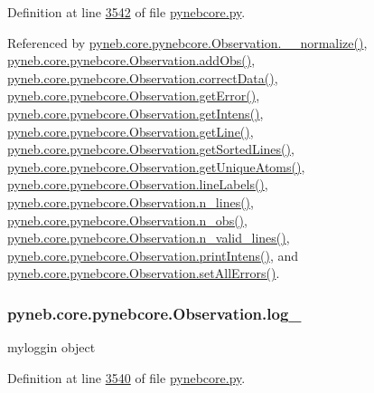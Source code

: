 Definition at line \hyperlink{pynebcore_8py_source_l03542}{3542} of file \hyperlink{pynebcore_8py_source}{pynebcore.\-py}.



Referenced by \hyperlink{pynebcore_8py_source_l04007}{pyneb.\-core.\-pynebcore.\-Observation.\-\_\-\-\_\-normalize()}, \hyperlink{pynebcore_8py_source_l03589}{pyneb.\-core.\-pynebcore.\-Observation.\-add\-Obs()}, \hyperlink{pynebcore_8py_source_l04028}{pyneb.\-core.\-pynebcore.\-Observation.\-correct\-Data()}, \hyperlink{pynebcore_8py_source_l03931}{pyneb.\-core.\-pynebcore.\-Observation.\-get\-Error()}, \hyperlink{pynebcore_8py_source_l03904}{pyneb.\-core.\-pynebcore.\-Observation.\-get\-Intens()}, \hyperlink{pynebcore_8py_source_l03665}{pyneb.\-core.\-pynebcore.\-Observation.\-get\-Line()}, \hyperlink{pynebcore_8py_source_l03684}{pyneb.\-core.\-pynebcore.\-Observation.\-get\-Sorted\-Lines()}, \hyperlink{pynebcore_8py_source_l03700}{pyneb.\-core.\-pynebcore.\-Observation.\-get\-Unique\-Atoms()}, \hyperlink{pynebcore_8py_source_l03615}{pyneb.\-core.\-pynebcore.\-Observation.\-line\-Labels()}, \hyperlink{pynebcore_8py_source_l03624}{pyneb.\-core.\-pynebcore.\-Observation.\-n\-\_\-lines()}, \hyperlink{pynebcore_8py_source_l03642}{pyneb.\-core.\-pynebcore.\-Observation.\-n\-\_\-obs()}, \hyperlink{pynebcore_8py_source_l03633}{pyneb.\-core.\-pynebcore.\-Observation.\-n\-\_\-valid\-\_\-lines()}, \hyperlink{pynebcore_8py_source_l03958}{pyneb.\-core.\-pynebcore.\-Observation.\-print\-Intens()}, and \hyperlink{pynebcore_8py_source_l04056}{pyneb.\-core.\-pynebcore.\-Observation.\-set\-All\-Errors()}.

\hypertarget{classpyneb_1_1core_1_1pynebcore_1_1_observation_a882b7909bc881e0c212dd5085305f4d4}{
\subsubsection[{log\-\_\-}]{\setlength{\rightskip}{0pt plus 5cm}pyneb.\-core.\-pynebcore.\-Observation.\-log\-\_\-}}\label{classpyneb_1_1core_1_1pynebcore_1_1_observation_a882b7909bc881e0c212dd5085305f4d4}


myloggin object 



Definition at line \hyperlink{pynebcore_8py_source_l03540}{3540} of file \hyperlink{pynebcore_8py_source}{pynebcore.\-py}.



